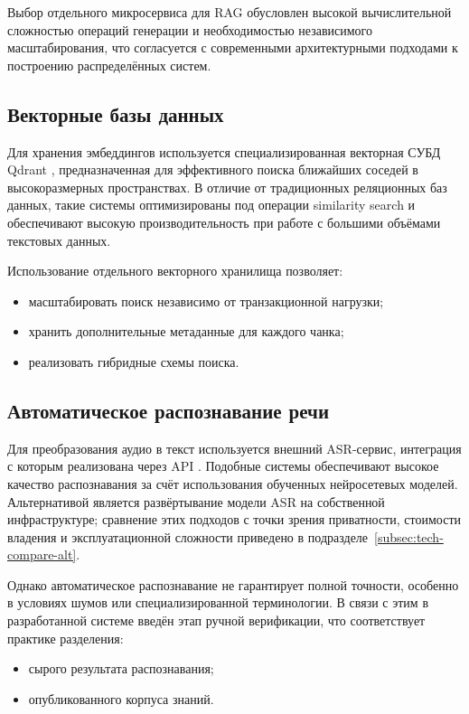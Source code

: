 \documentclass{article}
\begin{document}
Выбор отдельного микросервиса для RAG обусловлен высокой вычислительной сложностью операций генерации и необходимостью независимого масштабирования, что согласуется с современными архитектурными подходами к построению распределённых систем.

\subsection{Векторные базы данных}

Для хранения эмбеддингов используется специализированная векторная СУБД Qdrant \cite{qdrant_docs}, предназначенная для эффективного поиска ближайших соседей в высокоразмерных пространствах. В отличие от традиционных реляционных баз данных, такие системы оптимизированы под операции similarity search и обеспечивают высокую производительность при работе с большими объёмами текстовых данных.

Использование отдельного векторного хранилища позволяет:
\begin{itemize}
\item масштабировать поиск независимо от транзакционной нагрузки;
\item хранить дополнительные метаданные для каждого чанка;
\item реализовать гибридные схемы поиска.
\end{itemize}

\subsection{Автоматическое распознавание речи}

Для преобразования аудио в текст используется внешний ASR-сервис, интеграция с которым реализована через API \cite{assemblyai_docs, assemblyai_api}. Подобные системы обеспечивают высокое качество распознавания за счёт использования обученных нейросетевых моделей. Альтернативой является развёртывание модели ASR на собственной инфраструктуре; сравнение этих подходов с точки зрения приватности, стоимости владения и эксплуатационной сложности приведено в подразделе~\ref{subsec:tech-compare-alt}.

Однако автоматическое распознавание не гарантирует полной точности, особенно в условиях шумов или специализированной терминологии. В связи с этим в разработанной системе введён этап ручной верификации, что соответствует практике разделения:
\begin{itemize}
\item сырого результата распознавания;
\item опубликованного корпуса знаний.
\end{itemize}
\end{document}
